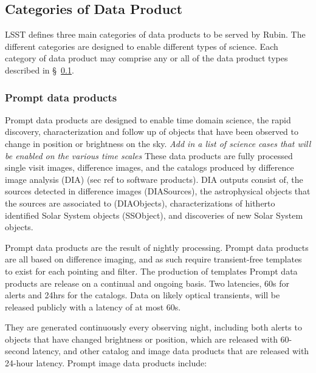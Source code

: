 \subsection{Categories of Data Product} \label{sec:dp-categories}
LSST defines three main categories of data products to be served by Rubin. 
The different categories are designed to enable different types of science. 
Each category of data product may comprise any or all of the data product types described in \S~\ref{sec:dp-categories}.

\subsubsection{Prompt data products} \label{sec:dp-prompt}
Prompt data products are designed to enable time domain science, the rapid discovery, characterization and follow up of objects that have been observed to change in position or brightness on the sky. 
{\it Add in a list of science cases that will be enabled on the various time scales}
These data products are fully processed single visit images, difference images, and the catalogs produced by difference image analysis (DIA)  (sec ref to software products). 
DIA outputs consist of,  the sources detected in difference images (DIASources), the astrophysical objects that the sources are associated to (DIAObjects), 
characterizations of hitherto identified Solar System objects (SSObject), and discoveries of new Solar System objects. 

Prompt data products are the result of nightly processing. 
Prompt data products are all based on difference imaging, and as such require transient-free templates to  exist for each pointing and filter. The production of templates 
Prompt data products are release on a continual and ongoing basis. 
Two latencies, 60s for alerts and 24hrs for the catalogs. Data on likely optical transients, will be released publicly with a latency of at most 60s.

They are generated continuously every observing night, including both alerts to objects that have changed brightness or position, 
which are released with 60-second latency, 
and other catalog and image data products that are released with 24-hour latency. 
Prompt image data products include: 

